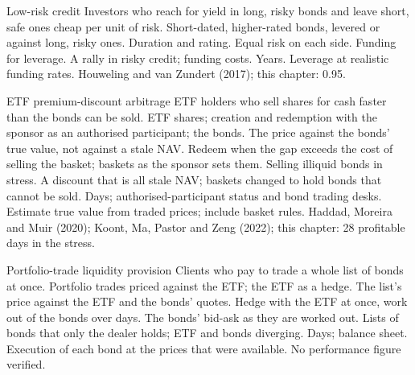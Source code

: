 \begin{strategyfile}{Low-risk credit}\label{strat:s2:systematic-credit-and-bond-etf-arbitrage:lowrisk}
 Investors who reach for yield in long, risky bonds and leave short, safe ones cheap per unit of risk.
 Short-dated, higher-rated bonds, levered or against long, risky ones.
 Duration and rating.
 Equal risk on each side.
 Funding for leverage.
 A rally in risky credit; funding costs.
 Years.
 Leverage at realistic funding rates.
 Houweling and van Zundert (2017); this chapter: 0.95.
\end{strategyfile}

\begin{strategyfile}{ETF premium-discount arbitrage}\label{strat:s2:systematic-credit-and-bond-etf-arbitrage:etf}
 ETF holders who sell shares for cash faster than the bonds can be sold.
 ETF shares; creation and redemption with the sponsor as an authorised participant; the bonds.
 The price against the bonds' true value, not against a stale NAV.
 Redeem when the gap exceeds the cost of selling the basket; baskets as the sponsor sets them.
 Selling illiquid bonds in stress.
 A discount that is all stale NAV; baskets changed to hold bonds that cannot be sold.
 Days; authorised-participant status and bond trading desks.
 Estimate true value from traded prices; include basket rules.
 Haddad, Moreira and Muir (2020); Koont, Ma, Pastor and Zeng (2022); this chapter: 28 profitable days in the stress.
\end{strategyfile}

\begin{strategyfile}{Portfolio-trade liquidity provision}\label{strat:s2:systematic-credit-and-bond-etf-arbitrage:portfolio}
 Clients who pay to trade a whole list of bonds at once.
 Portfolio trades priced against the ETF; the ETF as a hedge.
 The list's price against the ETF and the bonds' quotes.
 Hedge with the ETF at once, work out of the bonds over days.
 The bonds' bid-ask as they are worked out.
 Lists of bonds that only the dealer holds; ETF and bonds diverging.
 Days; balance sheet.
 Execution of each bond at the prices that were available.
 No performance figure verified.
\end{strategyfile}

